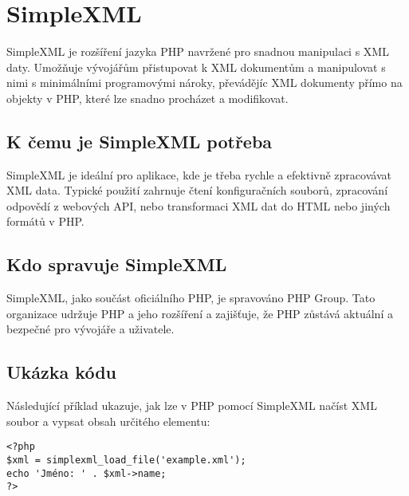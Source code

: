 \chapter{SimpleXML} %
\label{cha:SimpleXML}

SimpleXML je rozšíření jazyka PHP navržené pro snadnou manipulaci s XML daty. Umožňuje vývojářům přistupovat k XML dokumentům a manipulovat s nimi s minimálními programovými nároky, převádějíc XML dokumenty přímo na objekty v PHP, které lze snadno procházet a modifikovat.

\section{K čemu je SimpleXML potřeba}
SimpleXML je ideální pro aplikace, kde je třeba rychle a efektivně zpracovávat XML data. Typické použití zahrnuje čtení konfiguračních souborů, zpracování odpovědí z webových API, nebo transformaci XML dat do HTML nebo jiných formátů v PHP.

\section{Kdo spravuje SimpleXML}
SimpleXML, jako součást oficiálního PHP, je spravováno PHP Group. Tato organizace udržuje PHP a jeho rozšíření a zajišťuje, že PHP zůstává aktuální a bezpečné pro vývojáře a uživatele.

\section{Ukázka kódu}
Následující příklad ukazuje, jak lze v PHP pomocí SimpleXML načíst XML soubor a vypsat obsah určitého elementu:

\begin{verbatim}
<?php
$xml = simplexml_load_file('example.xml');
echo 'Jméno: ' . $xml->name;
?>
\end{verbatim}